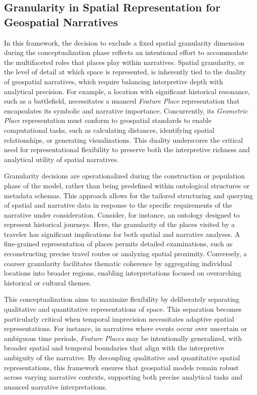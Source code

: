 \subsection{Granularity in Spatial Representation for Geospatial Narratives}

In this framework, the decision to exclude a fixed spatial granularity dimension during the conceptualization phase reflects an intentional effort to accommodate the multifaceted roles that places play within narratives. Spatial granularity, or the level of detail at which space is represented, is inherently tied to the duality of geospatial narratives, which require balancing interpretive depth with analytical precision. For example, a location with significant historical resonance, such as a battlefield, necessitates a nuanced \textit{Feature Place} representation that encapsulates its symbolic and narrative importance. Concurrently, its \textit{Geometric Place} representation must conform to geospatial standards to enable computational tasks, such as calculating distances, identifying spatial relationships, or generating visualizations. This duality underscores the critical need for representational flexibility to preserve both the interpretive richness and analytical utility of spatial narratives.

Granularity decisions are operationalized during the construction or population phase of the model, rather than being predefined within ontological structures or metadata schemas. This approach allows for the tailored structuring and querying of spatial and narrative data in response to the specific requirements of the narrative under consideration. Consider, for instance, an ontology designed to represent historical journeys. Here, the granularity of the places visited by a traveler has significant implications for both spatial and narrative analyses. A fine-grained representation of places permits detailed examinations, such as reconstructing precise travel routes or analyzing spatial proximity. Conversely, a coarser granularity facilitates thematic coherence by aggregating individual locations into broader regions, enabling interpretations focused on overarching historical or cultural themes.

This conceptualization aims to maximize flexibility by deliberately separating qualitative and quantitative representations of space. This separation becomes particularly critical when temporal imprecision necessitates adaptive spatial representations. For instance, in narratives where events occur over uncertain or ambiguous time periods, \textit{Feature Places} may be intentionally generalized, with broader spatial and temporal boundaries that align with the interpretive ambiguity of the narrative. By decoupling qualitative and quantitative spatial representations, this framework ensures that geospatial models remain robust across varying narrative contexts, supporting both precise analytical tasks and nuanced narrative interpretations.

